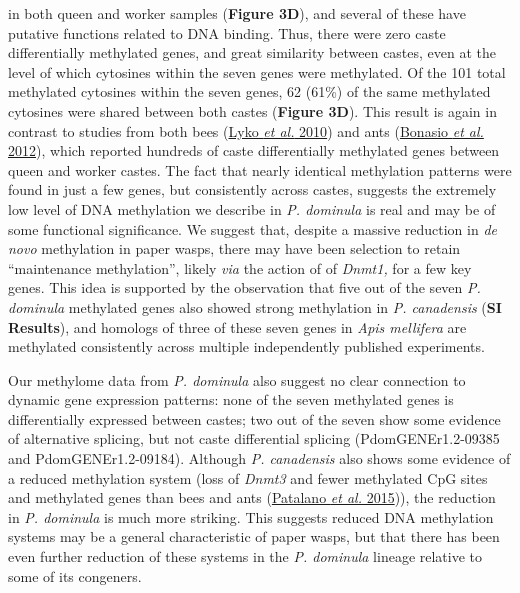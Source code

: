 in both queen and worker samples (\textbf{Figure 3D}), and several of
these have putative functions related to DNA binding. Thus, there were
zero caste differentially methylated genes, and great similarity between
castes, even at the level of which cytosines within the seven genes were
methylated. Of the 101 total methylated cytosines within the seven
genes, 62 (61\%) of the same methylated cytosines were shared between
both castes (\textbf{Figure 3D}). This result is again in contrast to
studies from both bees (\protect\hyperlink{ux5fENREFux5f33}{Lyko
\textit{et al.} 2010}) and ants
(\protect\hyperlink{ux5fENREFux5f4}{Bonasio \textit{et al.} 2012}), which
reported hundreds of caste differentially methylated genes between queen
and worker castes. The fact that nearly identical methylation patterns
were found in just a few genes, but consistently across castes, suggests
the extremely low level of DNA methylation we describe in \textit{P.
dominula} is real and may be of some functional significance. We suggest
that, despite a massive reduction in \textit{de novo} methylation in paper
wasps, there may have been selection to retain ``maintenance
methylation'', likely \textit{via} the action of of \textit{Dnmt1,} for a
few key genes. This idea is supported by the observation that five out
of the seven \textit{P. dominula} methylated genes also showed strong
methylation in \textit{P. canadensis} (\textbf{SI Results}), and homologs
of three of these seven genes in \textit{Apis mellifera} are methylated
consistently across multiple independently published experiments.

Our methylome data from \textit{P. dominula} also suggest no clear
connection to dynamic gene expression patterns: none of the seven
methylated genes is differentially expressed between castes; two out of
the seven show some evidence of alternative splicing, but not caste
differential splicing (PdomGENEr1.2-09385 and PdomGENEr1.2-09184).
Although \textit{P. canadensis} also shows some evidence of a reduced
methylation system (loss of \textit{Dnmt3} and fewer methylated CpG sites
and methylated genes than bees and ants
(\protect\hyperlink{ux5fENREFux5f43}{Patalano \textit{et al.} 2015})), the
reduction in \textit{P. dominula} is much more striking. This suggests
reduced DNA methylation systems may be a general characteristic of paper
wasps, but that there has been even further reduction of these systems
in the \textit{P. dominula} lineage relative to some of its congeners.

